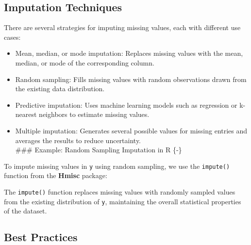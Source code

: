\documentclass[
  11pt,
]{book}
\makeatletter
\newenvironment{Shaded}{}{}
\newcommand{\FunctionTok}[1]{#1}
\newcommand{\NormalTok}[1]{#1}
\newcommand{\OtherTok}[1]{\textcolor[rgb]{0.39,0.39,0.39}{#1}}
\newcommand{\SpecialCharTok}[1]{\textcolor[rgb]{0.39,0.39,0.39}{#1}}
\newcommand{\StringTok}[1]{\textcolor[rgb]{0.39,0.39,0.39}{#1}}
\providecommand{\tightlist}{%
  \setlength{\itemsep}{0pt}\setlength{\parskip}{0pt}}
\newenvironment{kframe}{%
\medskip{}
\setlength{\fboxsep}{.8em}
 \def\at@end@of@kframe{}%
 \ifinner\ifhmode%
  \def\at@end@of@kframe{\end{minipage}}%
  \begin{minipage}{\columnwidth}%
 \fi\fi%
 \def\FrameCommand##1{\hskip\@totalleftmargin \hskip-\fboxsep
 \colorbox{shadecolor}{##1}\hskip-\fboxsep
     \hskip-\linewidth \hskip-\@totalleftmargin \hskip\columnwidth}%
 \MakeFramed {\advance\hsize-\width
   \@totalleftmargin\z@ \linewidth\hsize
   \@setminipage}}%
 {\par\unskip\endMakeFramed%
 \at@end@of@kframe}
\renewenvironment{Shaded}{\begin{kframe}}{\end{kframe}}
\theoremstyle{definition}
\theoremstyle{definition}
\theoremstyle{definition}
\theoremstyle{definition}
\theoremstyle{remark}
\makeatother
\begin{document}
\subsection*{Imputation Techniques}\label{imputation-techniques}


There are several strategies for imputing missing values, each with different use cases:

\begin{itemize}
\tightlist
\item
  Mean, median, or mode imputation: Replaces missing values with the mean, median, or mode of the corresponding column.\\
\item
  Random sampling: Fills missing values with random observations drawn from the existing data distribution.\\
\item
  Predictive imputation: Uses machine learning models such as regression or k-nearest neighbors to estimate missing values.\\
\item
  Multiple imputation: Generates several possible values for missing entries and averages the results to reduce uncertainty.\\
  \#\#\# Example: Random Sampling Imputation in R \{-\}
\end{itemize}

To impute missing values in \texttt{y} using random sampling, we use the \texttt{impute()} function from the \textbf{Hmisc} package:

\begin{Shaded}
\end{Shaded}

The \texttt{impute()} function replaces missing values with randomly sampled values from the existing distribution of \texttt{y}, maintaining the overall statistical properties of the dataset.

\subsection*{Best Practices}\label{best-practices}
\end{document}
